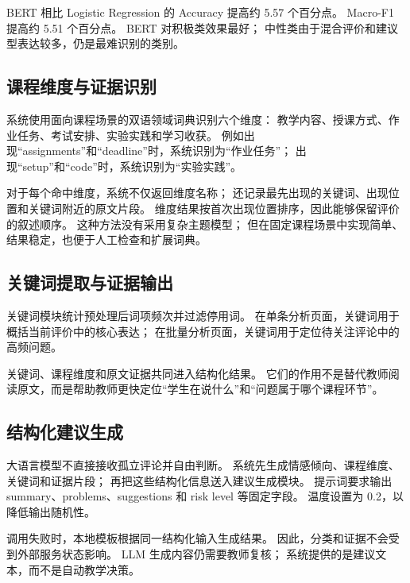 BERT 相比 Logistic Regression 的 Accuracy 提高约 5.57 个百分点。
Macro-F1 提高约 5.51 个百分点。
BERT 对积极类效果最好；
中性类由于混合评价和建议型表达较多，仍是最难识别的类别。

\subsection{课程维度与证据识别}

系统使用面向课程场景的双语领域词典识别六个维度：
教学内容、授课方式、作业任务、考试安排、实验实践和学习收获。
例如出现“assignments”和“deadline”时，系统识别为“作业任务”；
出现“setup”和“code”时，系统识别为“实验实践”。

对于每个命中维度，系统不仅返回维度名称；
还记录最先出现的关键词、出现位置和关键词附近的原文片段。
维度结果按首次出现位置排序，因此能够保留评价的叙述顺序。
这种方法没有采用复杂主题模型；
但在固定课程场景中实现简单、结果稳定，也便于人工检查和扩展词典。

\subsection{关键词提取与证据输出}

关键词模块统计预处理后词项频次并过滤停用词。
在单条分析页面，关键词用于概括当前评价中的核心表达；
在批量分析页面，关键词用于定位待关注评论中的高频问题。

关键词、课程维度和原文证据共同进入结构化结果。
它们的作用不是替代教师阅读原文，而是帮助教师更快定位“学生在说什么”和“问题属于哪个课程环节”。

\subsection{结构化建议生成}

大语言模型不直接接收孤立评论并自由判断。
系统先生成情感倾向、课程维度、关键词和证据片段；
再把这些结构化信息送入建议生成模块。
提示词要求输出 summary、problems、suggestions 和 risk level 等固定字段。
温度设置为 0.2，以降低输出随机性。

调用失败时，本地模板根据同一结构化输入生成结果。
因此，分类和证据不会受到外部服务状态影响。
LLM 生成内容仍需要教师复核；
系统提供的是建议文本，而不是自动教学决策。
